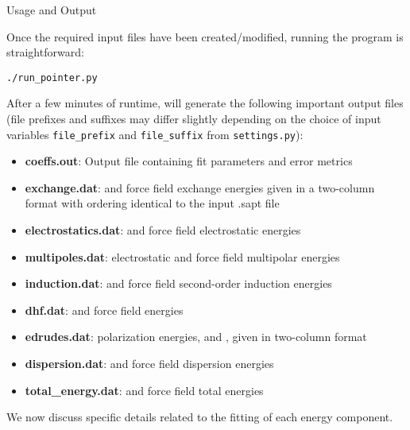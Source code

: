 \begin{subsection}{Usage and Output}

Once the required input files have been created/modified, running the \pointer
program is straightforward:
\begin{lstlisting}
./run_pointer.py
\end{lstlisting}

After a few minutes of runtime, \pointer will generate the following important output
files (file prefixes and suffixes may differ slightly depending on the choice
of input variables \verb|file_prefix| and \verb|file_suffix| from \verb|settings.py|):
\begin{itemize}
\item \textbf{coeffs.out}:
Output file containing fit parameters and error metrics
\item \textbf{exchange.dat}:
\sapt and force field exchange energies given in a two-column format with
ordering identical to the input .sapt file
\item \textbf{electrostatics.dat}:
\sapt and force field electrostatic energies
\item \textbf{multipoles.dat}:
\sapt electrostatic and force field multipolar energies
\item \textbf{induction.dat}:
\sapt and force field second-order induction energies
\item \textbf{dhf.dat}:
\sapt and force field \dhf energies
\item \textbf{edrudes.dat}:
polarization energies, \vdrudeind and \vdrudescf, given in two-column format
\item \textbf{dispersion.dat}:
\sapt and force field dispersion energies
\item \textbf{total\_energy.dat}:
\sapt and force field total energies
\end{itemize}

We now discuss specific details related to the fitting of each energy
component.

\end{subsection}

